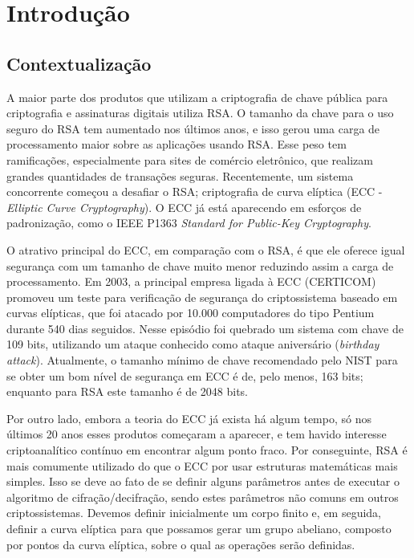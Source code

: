 \chapter*[Introdução]{Introdução}

\section*{Contextualização}
A maior parte dos produtos que utilizam a criptografia de chave pública para criptografia e assinaturas digitais utiliza RSA. O tamanho da chave para o uso seguro do RSA tem aumentado nos últimos anos, e isso gerou uma carga de processamento maior sobre as aplicações usando RSA. Esse peso tem ramificações, especialmente para sites de comércio eletrônico, que realizam grandes quantidades de transações seguras. Recentemente, um sistema concorrente começou a desafiar o RSA; criptografia de curva elíptica (ECC - \textit{Elliptic Curve Cryptography}). O ECC já está aparecendo em esforços de padronização, como o IEEE P1363 \textit{Standard for Public-Key Cryptography}. \cite{Lee:2011}

O atrativo principal do ECC, em comparação com o RSA, é que ele oferece igual segurança com um tamanho de chave muito menor reduzindo assim a carga de processamento. \cite{Stallings:2011} Em 2003, a principal empresa ligada à ECC (CERTICOM) promoveu um teste para verificação de segurança do criptossistema baseado em curvas elípticas, que foi atacado por 10.000 computadores do tipo Pentium durante 540 dias seguidos. Nesse episódio foi quebrado um sistema com chave de 109 bits, utilizando um ataque conhecido como ataque aniversário (\textit{birthday attack}). Atualmente, o tamanho mínimo de chave recomendado pelo NIST para se obter um bom nível de segurança em ECC é de, pelo menos, 163 bits; enquanto para RSA este tamanho é de 2048 bits. \cite{Sangalli:2011}

Por outro lado, embora a teoria do ECC já exista há algum tempo, só nos últimos 20 anos esses produtos começaram a aparecer, e tem havido interesse criptoanalítico contínuo em encontrar algum ponto fraco. \cite{Stallings:2011} Por conseguinte, RSA é mais comumente utilizado do que o ECC por usar estruturas matemáticas mais simples. Isso se deve ao fato de se definir alguns parâmetros antes de executar o algoritmo de cifração/decifração, sendo estes parâmetros não comuns em outros criptossistemas. Devemos definir inicialmente um corpo finito e, em seguida, definir a curva elíptica para que possamos gerar um grupo abeliano, composto por pontos da curva elíptica, sobre o qual as operações serão definidas. \cite{Sangalli:2011}

